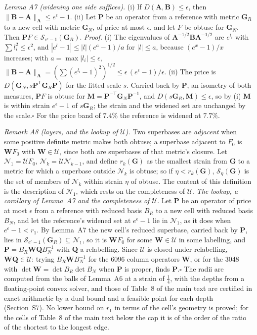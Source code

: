 \documentclass[preprint,pdf]{iucr}          %
\newcommand{\Gmet}{\mathbf{G}}
\newcommand{\Pop}{\mathbf{P}}
\newcommand{\Wop}{\mathbf{W}}
\newcommand{\Se}{\mathcal{S}_\eta}
\newcommand{\Lay}{\mathcal{N}}
\newcommand{\dist}{D}
\begin{document}
\emph{Lemma A7 (widening one side suffices).} (i) If $\dist(\mathbf A,\mathbf B)\le\epsilon$, then $\|\mathbf B-\mathbf A\|_{\mathbf A}\le e^\epsilon-1$. (ii) Let $\Pop$ be an operator from a reference with metric $\Gmet_R$ to a new cell with metric $\Gmet_N$, of price at most $\epsilon$, and let $F$ be obtuse for $\Gmet_N$. Then $\Pop F\in\mathcal S_{e^\epsilon-1}(\Gmet_R)$. \emph{Proof.} (i) The eigenvalues of $\mathbf A^{-1/2}\mathbf B\mathbf A^{-1/2}$ are $e^{l_i}$ with $\sum l_i^2\le\epsilon^2$, and $|e^{l}-1|\le|l|(e^{a}-1)/a$ for $|l|\le a$, because $(e^x-1)/x$ increases; with $a=\max|l_i|\le\epsilon$, $\|\mathbf B-\mathbf A\|_{\mathbf A}=(\sum(e^{l_i}-1)^2)^{1/2}\le\epsilon\,(e^\epsilon-1)/\epsilon$. (ii) The price is $\dist(\Gmet_N,s\Pop^{\mathsf T}\Gmet_R\Pop)$ for the fitted scale $s$. Carried back by $\Pop$, an isometry of both measures, $\Pop F$ is obtuse for $\mathbf M=\Pop^{-\mathsf T}\Gmet_N\Pop^{-1}$, and $\dist(s\Gmet_R,\mathbf M)\le\epsilon$, so by (i) $\mathbf M$ is within strain $e^\epsilon-1$ of $s\Gmet_R$; the strain and the widened set are unchanged by the scale.\hfill$\square$ For the price band of $7.4\%$ the reference is widened at $7.7\%$.

\emph{Remark A8 (layers, and the lookup of $\mathcal U$).} Two superbases are \emph{adjacent} when some positive definite metric makes both obtuse; a superbase adjacent to $F_0$ is $\Wop F_0$ with $\Wop\in\mathcal U$, since both are superbases of that metric's closure. Let $\Lay_1=\mathcal U F_0$, $\Lay_k=\mathcal U\Lay_{k-1}$, and define $r_k(\Gmet)$ as the smallest strain from $\Gmet$ to a metric for which a superbase outside $\Lay_k$ is obtuse; so if $\eta<r_k(\Gmet)$, $\Se(\Gmet)$ is the set of members of $\Lay_k$ within strain $\eta$ of obtuse. The content of this definition is the description of $\Lay_1$, which rests on the completeness of $\mathcal U$. \emph{The lookup, a corollary of Lemma~A7 and the completeness of $\mathcal U$.} Let $\Pop$ be an operator of price at most $\epsilon$ from a reference with reduced basis $B_R$ to a new cell with reduced basis $B_N$, and let the reference's widened set at $e^\epsilon-1$ lie in $\Lay_1$, as it does when $e^\epsilon-1<r_1$. By Lemma~A7 the new cell's reduced superbase, carried back by $\Pop$, lies in $\mathcal S_{e^\epsilon-1}(\Gmet_R)\subseteq\Lay_1$, so it is $\Wop F_0$ for some $\Wop\in\mathcal U$ in some labelling, and $\Pop=B_R\Wop\mathbf QB_N^{-1}$ with $\mathbf Q$ a relabelling. Since $\mathcal U$ is closed under relabelling, $\Wop\mathbf Q\in\mathcal U$: trying $B_R\Wop B_N^{-1}$ for the 6096 column operators $\Wop$, or for the 3048 with $\det\Wop=\det B_R\det B_N$ when $\Pop$ is proper, finds $\Pop$.\hfill$\square$ The radii are computed from the balls of Lemma~A6 at a strain of $\frac14$, with the depths from a floating-point convex solver, and those of Table~8 of the main text are certified in exact arithmetic by a dual bound and a feasible point for each depth (Section~S7). No lower bound on $r_1$ in terms of the cell's geometry is proved; for the cells of Table~8 of the main text below the cap it is of the order of the ratio of the shortest to the longest edge.
\end{document}
